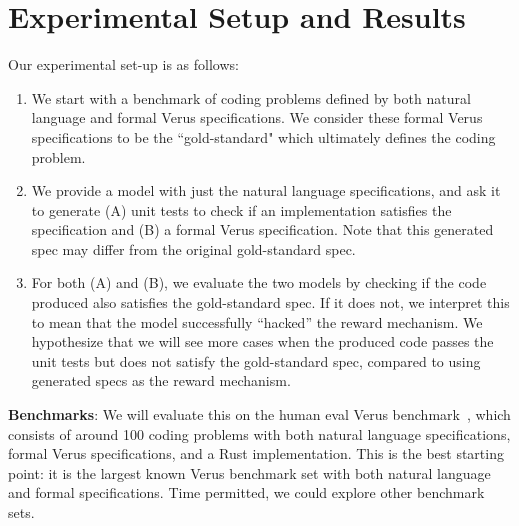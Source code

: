 \section{Experimental Setup and Results}
\label{results}

 Our experimental set-up is as follows:
\begin{enumerate}
    \item We start with a benchmark of coding problems 
    defined by both natural language and formal Verus specifications. 
    We consider these formal Verus specifications to be the ``gold-standard" 
    which ultimately defines the coding problem.
    \item We provide a model with just the natural language specifications, 
    and ask it to generate 
    (A) unit tests to check if an implementation satisfies the specification and 
    (B) a formal Verus specification. 
    Note that this generated spec may differ from the original gold-standard spec.
    \item For both (A) and (B), we evaluate the two models by checking if the code produced also satisfies
    the gold-standard spec. 
    If it does not, we interpret this to mean that the model successfully ``hacked''
    the reward mechanism. 
    We hypothesize that we will see more cases 
    when the produced code passes the unit tests but does not satisfy the gold-standard spec,
    compared to using generated specs as the reward mechanism.
\end{enumerate}
\begin{figure}[h]

\end{figure}


\textbf{Benchmarks}: We will evaluate this on the human eval Verus
benchmark~\cite{alphaverus}, which consists of around 100 coding problems with
both natural language specifications, formal Verus specifications, and a Rust
implementation. This is the best starting point: it is the largest known Verus
benchmark set with both natural language and formal specifications. Time
permitted, we could explore other benchmark sets.